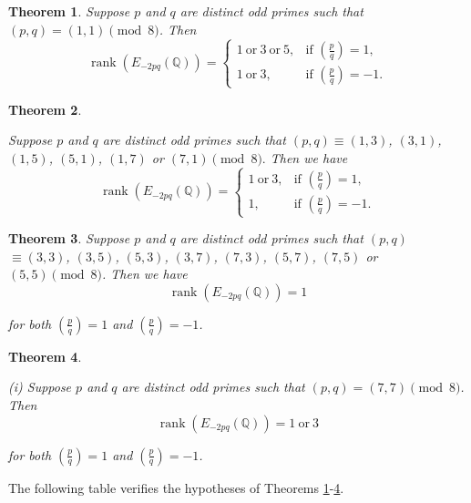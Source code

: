 \documentclass[12pt]{amsart}
\newcommand{\legendre}[2]{\genfrac{(}{)}{}{}{#1}{#2}}
\numberwithin{equation}{section}
\newtheorem{thm}{Theorem}[section]
\theoremstyle{definition}
\begin{document}
\begin{thm}
    \label{thm:1.1} Suppose $p$ and $q$ are distinct odd primes such that $(p,q)= (1,1) \pmod 8 $.  Then 
  $$
\operatorname{rank}(E_{-2pq}(\mathbb{Q}))=
\begin{cases}
1 \ \text{or}\ 3 \ \text{or}\ 5, & \text{if } \legendre{p}{q}=1,~~ \\
1 \ \text{or}\ 3, & \text{if }  \legendre{p}{q}=-1.
\end{cases}
$$
\end{thm}


\begin{thm}
    \label{thm:1.2} 
    
 
 Suppose $p$ and $q$ are distinct odd primes such that $(p,q) \equiv (1,3)$, $(3,1)$, $(1,5)$,  $(5,1)$, $(1,7)$ or $(7,1)\pmod 8.$ Then   we have
$$
\operatorname{rank}(E_{-2pq}(\mathbb{Q}))=
\begin{cases}
1 \ \text{or}\ 3, & \text{if } \legendre{p}{q}=1,~~ \\
1, & \text{if }  \legendre{p}{q}=-1.
\end{cases}$$

\end{thm}

\begin{thm}
    \label{thm:1.3} 
 Suppose $p$ and $q$ are distinct odd primes such that $(p,q)$ $\equiv  (3,3)$, $(3,5)$, $(5,3)$, $(3,7)$, $(7,3)$, $(5,7)$, $(7,5)$ or $(5,5) \pmod 8 $.  Then we have
  $$
\operatorname{rank}(E_{-2pq}(\mathbb{Q}))= 1
$$

for both $\legendre{p}{q}=1$ and $\legendre{p}{q}=-1$.

\end{thm}

\begin{thm}
    \label{thm:1.4} 
    
 \noindent  (i) Suppose $p$ and $q$ are distinct odd primes such that $(p,q)= (7,7) \pmod 8 $.   Then 
  $$
\operatorname{rank}(E_{-2pq}(\mathbb{Q}))= 1 \ \text{or}\ 3
$$

for both $\legendre{p}{q}=1$ and $\legendre{p}{q}=-1$.
\end{thm}

The following table verifies the hypotheses of Theorems \ref{thm:1.1}-\ref{thm:1.4}.
\end{document}
